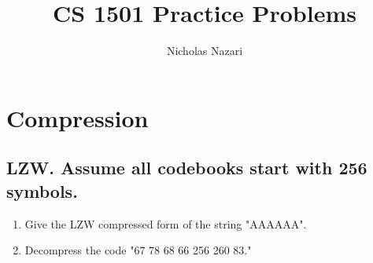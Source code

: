 \documentclass[12pt]{amsart}
\title{CS 1501 Practice Problems}
\author{Nicholas Nazari}
\date{} %
\begin{document}
\maketitle

\section{Compression}
\subsection{LZW. Assume all codebooks start with 256 symbols.}
\begin{enumerate}
\item{Give the LZW compressed form of the string "AAAAAA".}
\item{Decompress the code "67 78 68 66 256 260 83."}
\end{enumerate}
\end{document}
